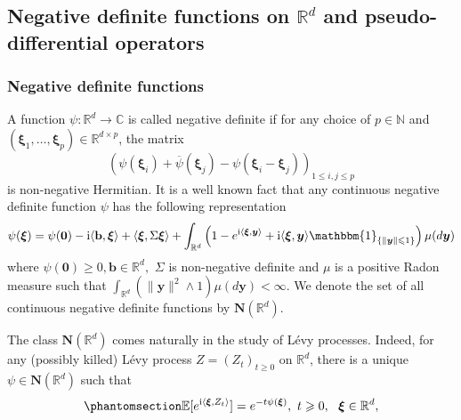 \documentclass[12pt]{amsart}
\newcommand{\hlabel}{\phantomsection\label}
\numberwithin{equation}{section}
\newcommand{\bb}{\mathbb}
\renewcommand{\ge}{\geqslant}
\renewcommand{\le}{\leqslant}
\renewcommand{\leq}{\leqslant}
\newcommand{\bbm}{\mathbbm}
\theoremstyle{definition}
\theoremstyle{assump}
\theoremstyle{remark}
\begin{document}
\subsection{Negative definite functions on $\bb{R}^d$ and pseudo-differential operators}
\subsubsection{Negative definite functions}
A function $\psi:\bb{R}^d\to\bb{C}$ is called negative definite if for any choice of $p\in\bb{N}$ and $(\bm{\xi}_1,\ldots, \bm{\xi}_p)\in\bb{R}^{d\times p}$, the matrix $$(\psi(\bm{\xi}_i)+\overline{\psi}(\bm{\xi}_j)-\psi(\bm{\xi}_i-\bm{\xi}_j))_{1\leq i,j\leq p}$$ is non-negative Hermitian. It is a well known fact that any continuous negative definite function $\psi$ has the following representation
\begin{align*}
\psi(\bm{\xi})=\psi(\bm{0})-\mathrm{i}\langle\mathbf{b},\bm{\xi}\rangle+\langle\bm{\xi},\Sigma\bm{\xi}\rangle+\int_{\bb{R}^d}\left(1-e^{{\rm{i}}\langle\bm{\xi},\bm{y}\rangle}+{\rm{i}}\langle\bm{\xi},\bm{y}\rangle\mathbbm{1}_{\{\|\bm{y}\|\le 1\}}\right)\mu(d\bm{y})
\end{align*}
where $\psi(\bm{0})\ge 0, \mathbf{b}\in\bb{R}^d,$ $\Sigma$ is non-negative definite and $\mu$ is a positive Radon measure such that $\int_{\bb{R}^d}(\|\bm{y}\|^2\wedge 1)\mu(d\bm{y})<\infty$. We denote the set of all continuous negative definite functions by $\mathbf{N}(\bb{R}^d)$.

The class $\mathbf{N}(\bb{R}^d)$ comes naturally in the  study of L\'evy processes. Indeed, for any (possibly killed) L\'evy process $Z=(Z_t)_{t\ge 0}$ on $\bb{R}^d$, there is a unique $\psi\in\mathbf{N}(\bb{R}^d)$ such that
\begin{align}\hlabel{eq:levy_kh}
\bb{E}[e^{{\rm{i}}\langle\bm{\xi}, Z_t\rangle}]=e^{-t\psi(\bm{\xi})}, \ t\ge 0, \ \  \bm{\xi}\in\bb{R}^d,
\end{align}
\end{document}
